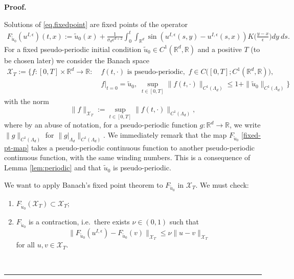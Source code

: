 \documentclass[10pt,a4paper]{amsart}
\newcommand{\R}{\mathbb{R}}
\newcommand{\ep}{\epsilon}
\newenvironment{proof}[1][Proof]{\noindent\textbf{#1.} }{\ \rule{0.5em}{0.5em}}
\newcommand{\red}[1]{{#1}}
\begin{document}
\begin{proof}

Solutions of \eqref{eq.fixedpoint} are fixed points of the operator
\begin{align}\label{fixed-pt-map}
F_{\tilde u_0}(u^{I,\ep})(t,x) :=\tilde  u_0(x) + \frac{1}{\sigma_d\ep^{d+2}}\int_0^t\int_{\red{\R^d}}\sin\left(u^{I,\ep}(s,y) - u^{I,\ep}(s,x)\right)K\Big(\frac{y-x}{\ep}\Big)dy\:ds.
\end{align}
For a fixed \red{pseudo-periodic} initial condition \red{$\tilde u_0\in C^1(\R^d,\R)$} and a positive $T$ (to be chosen later) we consider the Banach space 
\red{\begin{align}\label{banach-ball}
\mathcal{X}_T:=\Big\{f: [0,T]\times\R^d\to\R:\; & f(t,\cdot)\text{ is pseudo-periodic},\, \, f\in C\big([0,T];C^1(\R^d,\R)\big), \nonumber\\
&f|_{t=0}=\tilde u_0, \;  \sup_{t\in[0,T]}\|f(t,\cdot)\|_{C^1(\Lambda_d)}\le 1+\|\tilde u_0\|_{C^1(\Lambda_d)}\Big\}
\end{align}
with the norm 
\[
\|f\|_{\mathcal{X}_T} := \sup_{t\in[0,T]}\|f(t,\cdot)\|_{C^1(\Lambda_d)},
\]
where by an abuse of notation, for a pseudo-periodic function $g:\R^d\to\R$, we write $\|g\|_{C^1(\Lambda_d)}$ for $\|g|_{\Lambda_d}\|_{C^1(\Lambda_d)}$. We immediately remark that the map $F_{\tilde u_0}$ \eqref{fixed-pt-map} takes a pseudo-periodic continuous function to another pseudo-periodic continuous function, with the same winding numbers. This is a consequence of Lemma \ref{lem:periodic} and that $\tilde u_0$ is pseudo-periodic.
}

We want to apply Banach's fixed point theorem  to $F_{\tilde u_0}$ in $\mathcal{X}_T$. We must check:

\begin{enumerate}[label=(\alph*)]

\item $F_{\tilde u_0}(\mathcal{X}_T)\subset\mathcal{X}_T$;

\item $F_{\tilde u_0}$ is a contraction, i.e.~there exists $\nu\in(0,1)$ such that 
\begin{equation*}
\|F_{\tilde u_0}(u^{I,\ep})-F_{\tilde u_0}(v)\|_{\mathcal{X}_T}\leq \nu\|u-v\|_{\mathcal{X}_T}
\end{equation*}
for all $u, v\in \mathcal{X}_T$.
\end{enumerate}


\end{proof}
\end{document}
